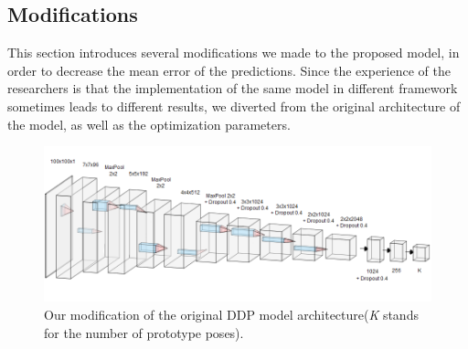 
%

\subsection{Modifications}
This section introduces several modifications we made to the proposed model, in order to decrease the mean error of the predictions. Since the experience of the researchers is that the implementation of the same model in different framework sometimes leads to different results, we diverted from the original architecture of the model, as well as the optimization parameters.\par
\vspace{5mm}
\begin{figure}[H]
\begin{center}
  \includegraphics[width=\textwidth]{images/implementation/mddp.png}
  \caption[Our modification of the original DDP model architecture.]{Our modification of the original DDP model architecture\break (\textit{K} stands for the number of prototype poses).}
  \label{fig:mddp}
\end{center}
\end{figure}

